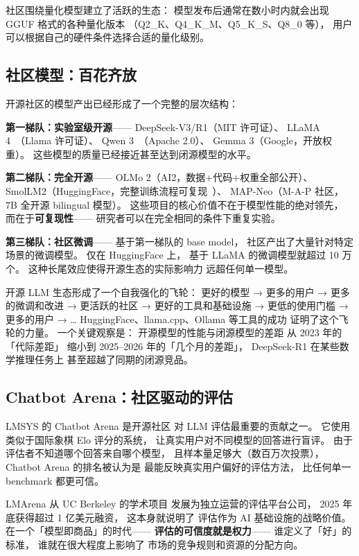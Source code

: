 社区围绕量化模型建立了活跃的生态：
模型发布后通常在数小时内就会出现
GGUF 格式的各种量化版本
（Q2\_K、Q4\_K\_M、Q5\_K\_S、Q8\_0 等），
用户可以根据自己的硬件条件选择合适的量化级别。

\subsection{社区模型：百花齐放}

开源社区的模型产出已经形成了一个完整的层次结构：

\textbf{第一梯队：实验室级开源}——
DeepSeek-V3/R1（MIT 许可证）、
LLaMA 4~\cite{dubey2024llama3}（Llama 许可证）、
Qwen 3~\cite{qwen2025qwen3}（Apache 2.0）、
Gemma 3（Google，开放权重）。
这些模型的质量已经接近甚至达到闭源模型的水平。

\textbf{第二梯队：完全开源}——
OLMo 2（AI2，数据+代码+权重全部公开）、
SmolLM2（HuggingFace，完整训练流程可复现~\cite{allal2025smollm2}）、
MAP-Neo（M-A-P 社区，7B 全开源 bilingual 模型）。
这些项目的核心价值不在于模型性能的绝对领先，
而在于\textbf{可复现性}——
研究者可以在完全相同的条件下重复实验。

\textbf{第三梯队：社区微调}——
基于第一梯队的 base model，
社区产出了大量针对特定场景的微调模型。
仅在 HuggingFace 上，
基于 LLaMA 的微调模型就超过 10 万个。
这种长尾效应使得开源生态的实际影响力
远超任何单一模型。

\begin{whybox}
开源 LLM 生态形成了一个自我强化的飞轮：
更好的模型 → 更多的用户 → 更多的微调和改进
→ 更活跃的社区 → 更好的工具和基础设施
→ 更低的使用门槛 → 更多的用户 → \ldots
HuggingFace、llama.cpp、Ollama 等工具的成功
证明了这个飞轮的力量。
一个关键观察是：
开源模型的性能与闭源模型的差距
从 2023 年的「代际差距」
缩小到 2025--2026 年的「几个月的差距」，
DeepSeek-R1 在某些数学推理任务上
甚至超越了同期的闭源竞品。
\end{whybox}

\subsection{Chatbot Arena：社区驱动的评估}

LMSYS 的 Chatbot Arena 是开源社区
对 LLM 评估最重要的贡献之一。
它使用类似于国际象棋 Elo 评分的系统，
让真实用户对不同模型的回答进行盲评。
由于评估者不知道哪个回答来自哪个模型，
且样本量足够大（数百万次投票），
Chatbot Arena 的排名被认为是
最能反映真实用户偏好的评估方法，
比任何单一 benchmark 都更可信。

LMArena 从 UC Berkeley 的学术项目
发展为独立运营的评估平台公司，
2025 年底获得超过 1 亿美元融资，
这本身就说明了
评估作为 AI 基础设施的战略价值。
在一个「模型即商品」的时代——
\textbf{评估的可信度就是权力}——
谁定义了「好」的标准，
谁就在很大程度上影响了
市场的竞争规则和资源的分配方向。

